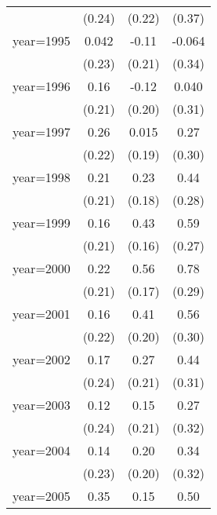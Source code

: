 \begin{sidewaystable}[htbp]
\begin{tabular}{l*{3}{c}}
                &   (0.24)         &   (0.22)         &   (0.37)         \\
\addlinespace
year=1995       &    0.042         &    -0.11         &   -0.064         \\
                &   (0.23)         &   (0.21)         &   (0.34)         \\
\addlinespace
year=1996       &     0.16         &    -0.12         &    0.040         \\
                &   (0.21)         &   (0.20)         &   (0.31)         \\
\addlinespace
year=1997       &     0.26         &    0.015         &     0.27         \\
                &   (0.22)         &   (0.19)         &   (0.30)         \\
\addlinespace
year=1998       &     0.21         &     0.23         &     0.44         \\
                &   (0.21)         &   (0.18)         &   (0.28)         \\
\addlinespace
year=1999       &     0.16         &     0.43\sym{**} &     0.59\sym{**} \\
                &   (0.21)         &   (0.16)         &   (0.27)         \\
\addlinespace
year=2000       &     0.22         &     0.56\sym{***}&     0.78\sym{***}\\
                &   (0.21)         &   (0.17)         &   (0.29)         \\
\addlinespace
year=2001       &     0.16         &     0.41\sym{**} &     0.56\sym{*}  \\
                &   (0.22)         &   (0.20)         &   (0.30)         \\
\addlinespace
year=2002       &     0.17         &     0.27         &     0.44         \\
                &   (0.24)         &   (0.21)         &   (0.31)         \\
\addlinespace
year=2003       &     0.12         &     0.15         &     0.27         \\
                &   (0.24)         &   (0.21)         &   (0.32)         \\
\addlinespace
year=2004       &     0.14         &     0.20         &     0.34         \\
                &   (0.23)         &   (0.20)         &   (0.32)         \\
\addlinespace
year=2005       &     0.35         &     0.15         &     0.50\sym{*}  \\

\end{tabular}
\end{sidewaystable}
